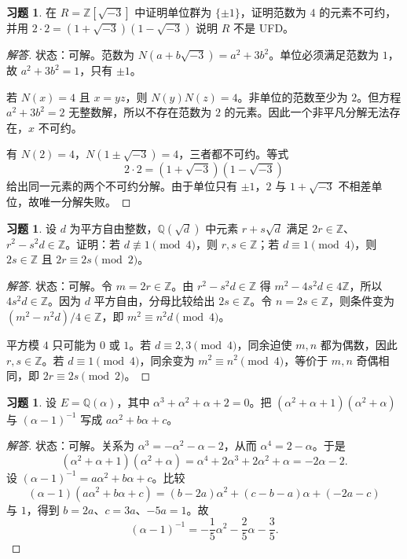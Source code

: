 \documentclass[11pt,a4paper,openany]{ctexbook}
\numberwithin{equation}{chapter}
\newcommand{\Q}{\mathbb{Q}}
\newcommand{\Z}{\mathbb{Z}}
\theoremstyle{plain}
\theoremstyle{definition}
\newtheorem{exercise}[theorem]{习题}
\theoremstyle{remark}
\begin{document}
\begin{exercise}
在 $R=\Z[\sqrt{-3}]$ 中证明单位群为 $\{\pm1\}$，证明范数为 $4$ 的元素不可约，并用 $2\cdot2=(1+\sqrt{-3})(1-\sqrt{-3})$ 说明 $R$ 不是 UFD。
\end{exercise}
\begin{proof}[解答]
状态：可解。范数为 $N(a+b\sqrt{-3})=a^2+3b^2$。单位必须满足范数为 $1$，故 $a^2+3b^2=1$，只有 $\pm1$。

若 $N(x)=4$ 且 $x=yz$，则 $N(y)N(z)=4$。非单位的范数至少为 $2$。但方程 $a^2+3b^2=2$ 无整数解，所以不存在范数为 $2$ 的元素。因此一个非平凡分解无法存在，$x$ 不可约。

有 $N(2)=4$，$N(1\pm\sqrt{-3})=4$，三者都不可约。等式
\[
2\cdot2=(1+\sqrt{-3})(1-\sqrt{-3})
\]
给出同一元素的两个不可约分解。由于单位只有 $\pm1$，$2$ 与 $1+\sqrt{-3}$ 不相差单位，故唯一分解失败。
\end{proof}

\begin{exercise}
设 $d$ 为平方自由整数，$\Q(\sqrt d)$ 中元素 $r+s\sqrt d$ 满足 $2r\in\Z$、$r^2-s^2d\in\Z$。证明：若 $d\not\equiv1\pmod4$，则 $r,s\in\Z$；若 $d\equiv1\pmod4$，则 $2s\in\Z$ 且 $2r\equiv2s\pmod2$。
\end{exercise}
\begin{proof}[解答]
状态：可解。令 $m=2r\in\Z$。由 $r^2-s^2d\in\Z$ 得 $m^2-4s^2d\in4\Z$，所以 $4s^2d\in\Z$。因为 $d$ 平方自由，分母比较给出 $2s\in\Z$。令 $n=2s\in\Z$，则条件变为 $(m^2-n^2d)/4\in\Z$，即 $m^2\equiv n^2d\pmod4$。

平方模 $4$ 只可能为 $0$ 或 $1$。若 $d\equiv2,3\pmod4$，同余迫使 $m,n$ 都为偶数，因此 $r,s\in\Z$。若 $d\equiv1\pmod4$，同余变为 $m^2\equiv n^2\pmod4$，等价于 $m,n$ 奇偶相同，即 $2r\equiv2s\pmod2$。
\end{proof}

\begin{exercise}
设 $E=\Q(\alpha)$，其中 $\alpha^3+\alpha^2+\alpha+2=0$。把 $(\alpha^2+\alpha+1)(\alpha^2+\alpha)$ 与 $(\alpha-1)^{-1}$ 写成 $a\alpha^2+b\alpha+c$。
\end{exercise}
\begin{proof}[解答]
状态：可解。关系为 $\alpha^3=-\alpha^2-\alpha-2$，从而 $\alpha^4=2-\alpha$。于是
\[
(\alpha^2+\alpha+1)(\alpha^2+\alpha)=\alpha^4+2\alpha^3+2\alpha^2+\alpha=-2\alpha-2.
\]
设 $(\alpha-1)^{-1}=a\alpha^2+b\alpha+c$。比较
\[
(\alpha-1)(a\alpha^2+b\alpha+c)
=(b-2a)\alpha^2+(c-b-a)\alpha+(-2a-c)
\]
与 $1$，得到 $b=2a$、$c=3a$、$-5a=1$。故
\[
(\alpha-1)^{-1}=-\frac15\alpha^2-\frac25\alpha-\frac35.
\]
\end{proof}
\end{document}
